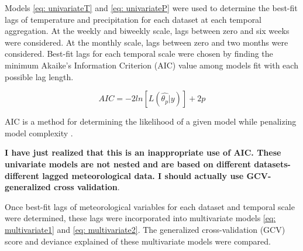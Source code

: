 Models \ref{eq: univariateT} and \ref{eq: univariateP} were used to determine the best-fit lags of temperature and precipitation for each dataset at each temporal aggregation. At the weekly and biweekly scale, lags between zero and six weeks were considered. At the monthly scale, lags between zero and two months were considered. Best-fit lags for each temporal scale were chosen by finding the minimum Akaike's Information Criterion (AIC) value among models fit with each possible lag length. 

\begin{equation}
	AIC = -2ln[L(\hat{\theta_{p}}|y)] + 2p
	\label{eq: AIC}
\end{equation}

AIC is a method for determining the likelihood of a given model while penalizing model complexity \citep{JOHNSON2004101}. 

\textbf{I have just realized that this is an inappropriate use of AIC. These univariate models are not nested and are based on different datasets- different lagged meteorological data. I should actually use GCV- generalized cross validation}.

Once best-fit lags of meteorological variables for each dataset and temporal scale were determined, these lags were incorporated into multivariate models \ref{eq: multivariate1} and \ref{eq: multivariate2}. The generalized cross-validation (GCV) score and deviance explained of these multivariate models were compared. 


